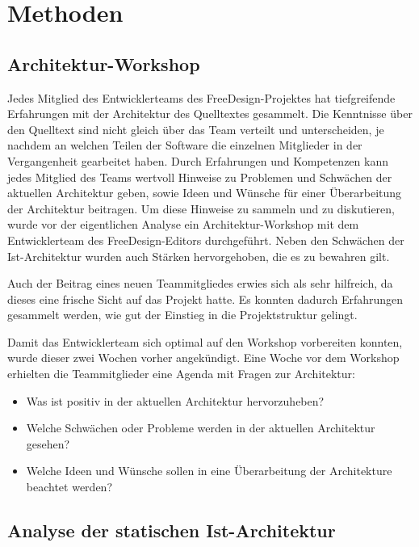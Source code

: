 \chapter{Methoden}

\section{Architektur-Workshop}
Jedes Mitglied des Entwicklerteams des FreeDesign-Projektes hat tiefgreifende Erfahrungen mit der Architektur des Quelltextes gesammelt. 
Die Kenntnisse über den Quelltext sind nicht gleich über das Team verteilt und unterscheiden, je nachdem an welchen Teilen der Software die einzelnen Mitglieder in der Vergangenheit gearbeitet haben.
Durch Erfahrungen und Kompetenzen kann jedes Mitglied des Teams wertvoll Hinweise zu Problemen und Schwächen der aktuellen Architektur geben, sowie Ideen und Wünsche für einer Überarbeitung der Architektur beitragen.
Um diese Hinweise zu sammeln und zu diskutieren, wurde vor der eigentlichen Analyse ein Architektur-Workshop mit dem Entwicklerteam des FreeDesign-Editors durchgeführt. Neben den Schwächen der Ist-Architektur wurden auch Stärken hervorgehoben, die es zu bewahren gilt.

Auch der Beitrag eines neuen Teammitgliedes erwies sich als sehr hilfreich, da dieses eine frische Sicht auf das Projekt hatte. Es konnten dadurch Erfahrungen gesammelt werden, wie gut der Einstieg in die Projektstruktur gelingt. 

Damit das Entwicklerteam sich optimal auf den Workshop vorbereiten konnten, wurde dieser zwei Wochen vorher angekündigt. Eine Woche vor dem Workshop erhielten die Teammitglieder eine Agenda mit Fragen zur Architektur:
\begin{itemize}
	\item Was ist positiv in der aktuellen Architektur hervorzuheben?
	\item Welche Schwächen oder Probleme werden in der aktuellen Architektur gesehen?
	\item Welche Ideen und Wünsche sollen in eine Überarbeitung der Architekture beachtet werden?
\end{itemize}


\section{Analyse der statischen Ist-Architektur}
